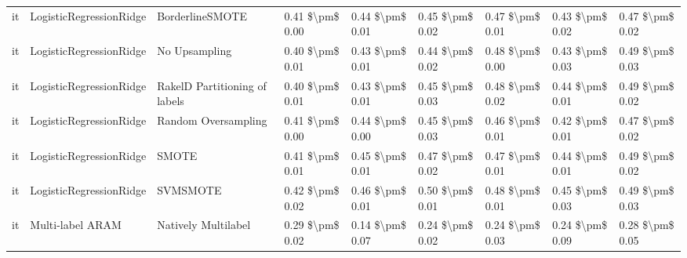 \begin{tabular}{lllllllll}
      it &         LogisticRegressionRidge &               BorderlineSMOTE & 0.41 \$\textbackslash pm\$ 0.00 &           0.44 \$\textbackslash pm\$ 0.01 &       0.45 \$\textbackslash pm\$ 0.02 &        0.47 \$\textbackslash pm\$ 0.01 &                         0.43 \$\textbackslash pm\$ 0.02 &     0.47 \$\textbackslash pm\$ 0.02 \\
      it &         LogisticRegressionRidge &                 No Upsampling & 0.40 \$\textbackslash pm\$ 0.01 &           0.43 \$\textbackslash pm\$ 0.01 &       0.44 \$\textbackslash pm\$ 0.02 &        0.48 \$\textbackslash pm\$ 0.00 &                         0.43 \$\textbackslash pm\$ 0.03 &     0.49 \$\textbackslash pm\$ 0.03 \\
      it &         LogisticRegressionRidge & RakelD Partitioning of labels & 0.40 \$\textbackslash pm\$ 0.01 &           0.43 \$\textbackslash pm\$ 0.01 &       0.45 \$\textbackslash pm\$ 0.03 &        0.48 \$\textbackslash pm\$ 0.02 &                         0.44 \$\textbackslash pm\$ 0.01 &     0.49 \$\textbackslash pm\$ 0.02 \\
      it &         LogisticRegressionRidge &           Random Oversampling & 0.41 \$\textbackslash pm\$ 0.00 &           0.44 \$\textbackslash pm\$ 0.00 &       0.45 \$\textbackslash pm\$ 0.03 &        0.46 \$\textbackslash pm\$ 0.01 &                         0.42 \$\textbackslash pm\$ 0.01 &     0.47 \$\textbackslash pm\$ 0.02 \\
      it &         LogisticRegressionRidge &                         SMOTE & 0.41 \$\textbackslash pm\$ 0.01 &           0.45 \$\textbackslash pm\$ 0.01 &       0.47 \$\textbackslash pm\$ 0.02 &        0.47 \$\textbackslash pm\$ 0.01 &                         0.44 \$\textbackslash pm\$ 0.01 &     0.49 \$\textbackslash pm\$ 0.02 \\
      it &         LogisticRegressionRidge &                      SVMSMOTE & 0.42 \$\textbackslash pm\$ 0.02 &           0.46 \$\textbackslash pm\$ 0.01 &       0.50 \$\textbackslash pm\$ 0.01 &        0.48 \$\textbackslash pm\$ 0.01 &                         0.45 \$\textbackslash pm\$ 0.03 &     0.49 \$\textbackslash pm\$ 0.03 \\
      it &                Multi-label ARAM &           Natively Multilabel & 0.29 \$\textbackslash pm\$ 0.02 &           0.14 \$\textbackslash pm\$ 0.07 &       0.24 \$\textbackslash pm\$ 0.02 &        0.24 \$\textbackslash pm\$ 0.03 &                         0.24 \$\textbackslash pm\$ 0.09 &     0.28 \$\textbackslash pm\$ 0.05 \\

\end{tabular}
